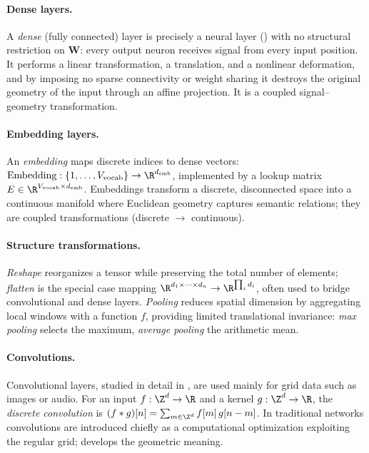 \paragraph{Dense layers.}
A \emph{dense} (fully connected) layer is precisely a neural layer
() with no structural restriction on $\mathbf{W}$: every
output neuron receives signal from every input position. It performs a linear
transformation, a translation, and a nonlinear deformation, and by imposing no
sparse connectivity or weight sharing it destroys the original geometry of the
input through an affine projection. It is a coupled signal--geometry
transformation.

\paragraph{Embedding layers.}
An \emph{embedding} maps discrete indices to dense vectors:
$\mathrm{Embedding} : \{1, \ldots, V_{\mathrm{vocab}}\} \to \R^{d_{\mathrm{emb}}}$,
implemented by a lookup matrix
$E \in \R^{V_{\mathrm{vocab}} \times d_{\mathrm{emb}}}$. Embeddings transform a
discrete, disconnected space into a continuous manifold where Euclidean geometry
captures semantic relations; they are coupled transformations (discrete
$\to$ continuous).

\paragraph{Structure transformations.}
\emph{Reshape} reorganizes a tensor while preserving the total number of
elements; \emph{flatten} is the special case mapping
$\R^{d_1 \times \cdots \times d_n} \to \R^{\prod_i d_i}$, often used to bridge
convolutional and dense layers. \emph{Pooling} reduces spatial dimension by
aggregating local windows with a function $f$, providing limited translational
invariance: \emph{max pooling} selects the maximum, \emph{average pooling} the
arithmetic mean.

\paragraph{Convolutions.}
Convolutional layers, studied in detail in , are used mainly for
grid data such as images or audio. For an input $f : \Z^d \to \R$ and a kernel
$g : \Z^d \to \R$, the \emph{discrete convolution} is
$(f * g)[n] = \sum_{m \in \Z^d} f[m]\, g[n - m]$. In traditional networks
convolutions are introduced chiefly as a computational optimization exploiting
the regular grid;  develops the geometric meaning.

